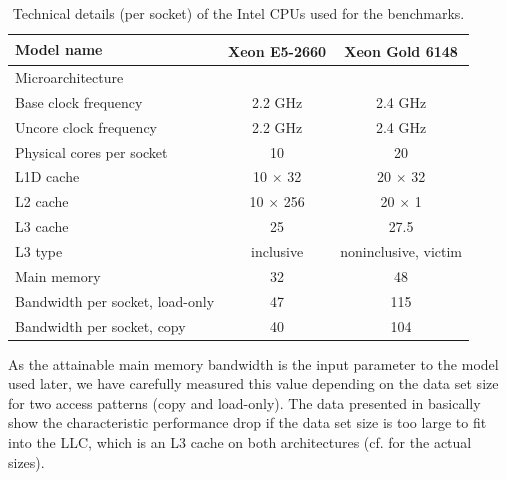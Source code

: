 \begin{table}[t]
	\centering
	\caption{Technical details (per socket) of the Intel CPUs used for the benchmarks.\label{tab:test_bed}}
	\begin{center}
		\begin{tabular}{l|cc}
			{Model name} & {Xeon\textsuperscript{\textregistered} E5-2660} & {Xeon\textsuperscript{\textregistered} Gold 6148} \\\midrule
			{Microarchitecture} & {\IVB} & {\SKX} \\\midrule
			{Base clock frequency} & {2.2 GHz} & {2.4 GHz}\\
			{Uncore clock frequency} & {2.2 GHz} & {2.4 GHz}\\
			{Physical cores per socket} & {10} & {20} \\
			{L1D cache} & {10 $\times$ 32 \KiB} & {20 $\times$ 32 \KiB}\\
			{L2 cache} & {10 $\times$ 256 \KiB} & {20 $\times$ 1 \MiB} \\
			{L3 cache} & {25 \MiB} & {27.5 \MiB}\\
			{L3 type} & {inclusive} & {noninclusive, victim}\\
			{Main memory} & {32 \GiB} & {48 \GiB}\\
			{Bandwidth per socket, load-only} & {47 \GBS} & {115 \GBS}\\ %
			{Bandwidth per socket, copy} & {40 \GBS} & {104 \GBS}\\
		\end{tabular}
	\end{center}
\end{table} 
As the attainable main memory bandwidth is the input parameter to the \roofline model used later, we have carefully measured this value depending on the data set size for two access patterns (copy and load-only). The data presented in  basically show the characteristic performance drop if the data set size is too large to fit into the \acrfull{LLC}, which is an L3 cache on both architectures (cf.  for the actual sizes). 
